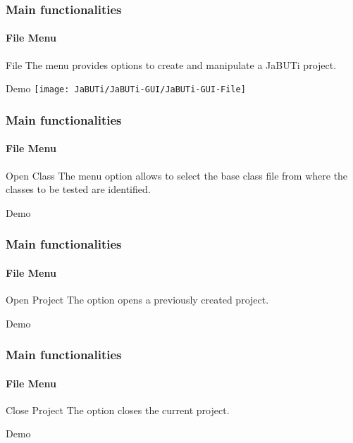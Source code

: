 \begin{frame}[parent={cmap:jabuti-gui},hasnext=true,hasprev=true]
\frametitle{Main functionalities}
\framesubtitle{File Menu}
\label{concept:file-menu}

\begin{block}{File}
The  menu provides options to create and manipulate a JaBUTi project.
\end{block}

\begin{block}{Demo}
\texttt{[image: JaBUTi/JaBUTi-GUI/JaBUTi-GUI-File]}
\end{block}
\end{frame}



\begin{frame}
\frametitle{Main functionalities}
\framesubtitle{File Menu}
\label{concept:open-class}

\begin{block}{Open Class}
The  menu option allows to select the base
class file from where the classes to be tested are identified.
\end{block}

\begin{block}{Demo}
\end{block}
\end{frame}



\begin{frame}
\frametitle{Main functionalities}
\framesubtitle{File Menu}
\label{concept:open-project}

\begin{block}{Open Project}
The  option opens a previously created project.
\end{block}

\begin{block}{Demo}
\end{block}
\end{frame}



\begin{frame}
\frametitle{Main functionalities}
\framesubtitle{File Menu}
\label{concept:close-project}

\begin{block}{Close Project}
The  option closes the current project.
\end{block}

\begin{block}{Demo}
\end{block}
\end{frame}



